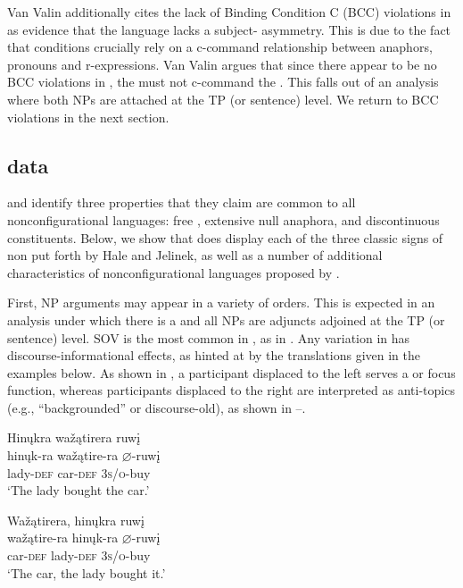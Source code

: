 \documentclass[output=paper]{LSP/langsci}
\begin{document}
Van Valin additionally cites the lack of Binding Condition C (BCC) violations in  as evidence that the language lacks a subject- asymmetry.  This is due to the fact that  conditions crucially rely on a c-command relationship between anaphors, pronouns and r-expressions.  Van Valin argues that since there appear to be no BCC violations in , the  must not c-command the . This falls out of an analysis where both NPs are attached at the TP (or sentence) level. We return to BCC violations in the next section.

\subsection{ data}\label{sec:jrs:2.3}

\citet{Hale1983} and \citet{Jelinek1984} identify three properties that they claim are common to all nonconfigurational languages: free , extensive null anaphora, and discontinuous constituents. Below, we show that  does display each of the three classic signs of non put forth by Hale and Jelinek, as well as a number of additional characteristics of nonconfigurational languages proposed by \citet{Baker1996}.  

First, NP arguments may appear in a variety of orders.  This is expected in an analysis under which there is a  and all NPs are adjuncts adjoined at the TP (or sentence) level. SOV  is the most common in , as in . Any variation in  has discourse-informational effects, as hinted at by the  translations given in the examples below. As shown in , a participant displaced to the left serves a  or focus function, whereas participants displaced to the right are interpreted as anti-topics (e.g., ``backgrounded'' or discourse-old), as shown in --.

\ea
\label{ex:jrs:11} 
\glll Hin\k{u}kra wa\v{z}ątirera ruw\k{i}  \\
hin\k{u}k-ra	wa\v{z}ątire-ra 	$\varnothing$-ruw\k{i} \\
lady-\textsc{def}	car-\textsc{def}	 \textsc{3s/o}-buy \\
\trans `The lady bought the car.'
\z

\ea\label{ex:jrs:12}
\ea\label{ex:jrs:12a}
\glll Wa\v{z}ątirera,	hin\k{u}kra		ruw\k{i} \\
wa\v{z}ątire-ra 	hin\k{u}k-ra		$\varnothing$-ruw\k{i} \\
car-\textsc{def}			lady-\textsc{def}		\textsc{3s/o}-buy \\
\trans `The car, the lady bought it.' 
\end{document}
